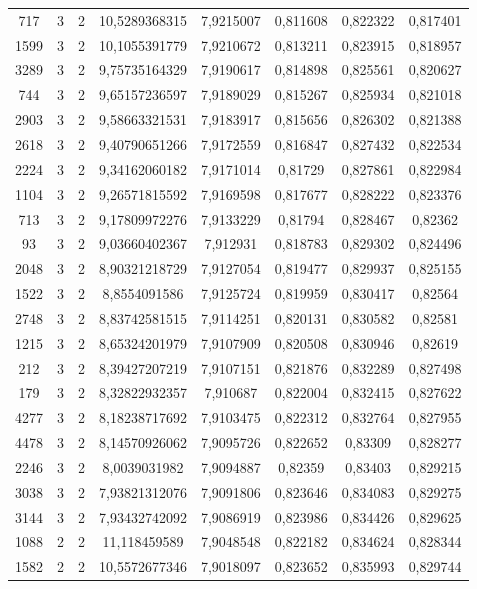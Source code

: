 \begin{longtable}{|c|c|c|c|c|c|c|c|}
717 & 3 & 2 & 10,5289368315 & 7,9215007 & 0,811608 & 0,822322 & 0,817401 \\
1599 & 3 & 2 & 10,1055391779 & 7,9210672 & 0,813211 & 0,823915 & 0,818957 \\
3289 & 3 & 2 & 9,75735164329 & 7,9190617 & 0,814898 & 0,825561 & 0,820627 \\
744 & 3 & 2 & 9,65157236597 & 7,9189029 & 0,815267 & 0,825934 & 0,821018 \\
2903 & 3 & 2 & 9,58663321531 & 7,9183917 & 0,815656 & 0,826302 & 0,821388 \\
2618 & 3 & 2 & 9,40790651266 & 7,9172559 & 0,816847 & 0,827432 & 0,822534 \\
2224 & 3 & 2 & 9,34162060182 & 7,9171014 & 0,81729 & 0,827861 & 0,822984 \\
1104 & 3 & 2 & 9,26571815592 & 7,9169598 & 0,817677 & 0,828222 & 0,823376 \\
713 & 3 & 2 & 9,17809972276 & 7,9133229 & 0,81794 & 0,828467 & 0,82362 \\
93 & 3 & 2 & 9,03660402367 & 7,912931 & 0,818783 & 0,829302 & 0,824496 \\
2048 & 3 & 2 & 8,90321218729 & 7,9127054 & 0,819477 & 0,829937 & 0,825155 \\
1522 & 3 & 2 & 8,8554091586 & 7,9125724 & 0,819959 & 0,830417 & 0,82564 \\
2748 & 3 & 2 & 8,83742581515 & 7,9114251 & 0,820131 & 0,830582 & 0,82581 \\
1215 & 3 & 2 & 8,65324201979 & 7,9107909 & 0,820508 & 0,830946 & 0,82619 \\
212 & 3 & 2 & 8,39427207219 & 7,9107151 & 0,821876 & 0,832289 & 0,827498 \\
179 & 3 & 2 & 8,32822932357 & 7,910687 & 0,822004 & 0,832415 & 0,827622 \\
4277 & 3 & 2 & 8,18238717692 & 7,9103475 & 0,822312 & 0,832764 & 0,827955 \\
4478 & 3 & 2 & 8,14570926062 & 7,9095726 & 0,822652 & 0,83309 & 0,828277 \\
2246 & 3 & 2 & 8,0039031982 & 7,9094887 & 0,82359 & 0,83403 & 0,829215 \\
3038 & 3 & 2 & 7,93821312076 & 7,9091806 & 0,823646 & 0,834083 & 0,829275 \\
3144 & 3 & 2 & 7,93432742092 & 7,9086919 & 0,823986 & 0,834426 & 0,829625 \\
1088 & 2 & 2 & 11,118459589 & 7,9048548 & 0,822182 & 0,834624 & 0,828344 \\
1582 & 2 & 2 & 10,5572677346 & 7,9018097 & 0,823652 & 0,835993 & 0,829744 \\

\end{longtable}
